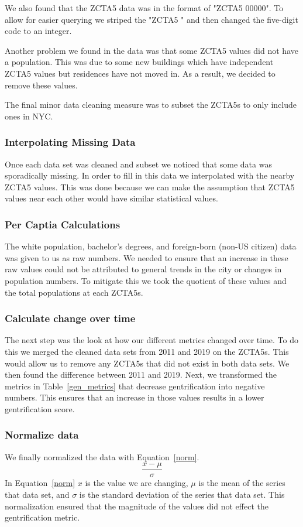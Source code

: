 \documentclass[conference]{IEEEtran}
\begin{document}
We also found that the ZCTA5 data was in the format of "ZCTA5 00000". To allow for easier querying we striped the "ZCTA5 " and then changed the five-digit code to an integer.

Another problem we found in the data was that some ZCTA5 values did not have a population. This was due to some new buildings which have independent ZCTA5 values but residences have not moved in. As a result, we decided to remove these values.

The final minor data cleaning measure was to subset the ZCTA5s to only include ones in NYC.

\subsubsection{Interpolating Missing Data}
Once each data set was cleaned and subset we noticed that some data was sporadically missing. In order to fill in this data we interpolated with the nearby ZCTA5 values. This was done because we can make the assumption that ZCTA5 values near each other would have similar statistical values.

\subsubsection{Per Captia Calculations}
The white population, bachelor's degrees, and foreign-born (non-US citizen) data was given to us as raw numbers. We needed to ensure that an increase in these raw values could not be attributed to general trends in the city or changes in population numbers. To mitigate this we took the quotient of these values and the total populations at each ZCTA5s.

\subsubsection{Calculate change over time}
The next step was the look at how our different metrics changed over time. To do this we merged the cleaned data sets from 2011 and 2019 on the ZCTA5s. This would allow us to remove any ZCTA5s that did not exist in both data sets. We then found the difference between 2011 and 2019. Next, we transformed the metrics in Table~\ref{gen_metrics} that decrease gentrification into negative numbers. This ensures that an increase in those values results in a lower gentrification score.

\subsubsection{Normalize data}
We finally normalized the data with Equation~\ref{norm}.
\begin{equation}
\frac{x-\mu}{\sigma}\label{norm}
\end{equation}
In Equation~\ref{norm} $x$ is the value we are changing, $\mu$ is the mean of the series that data set, and $\sigma$ is the standard deviation of the series that data set. This normalization ensured that the magnitude of the values did not effect the gentrification metric.
\end{document}
